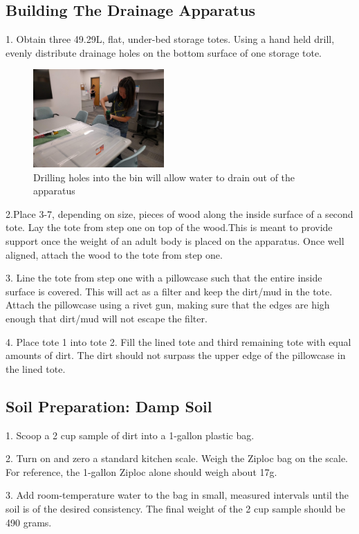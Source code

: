 \subsection{Building The Drainage Apparatus}

1. Obtain three 49.29L, flat, under-bed storage totes. Using a hand held drill, evenly distribute drainage holes on the bottom surface of one storage tote.

\begin{figure}[!htp]
\centering
\includegraphics[width=5cm]{Cast_Drill}
\caption{Drilling holes into the bin will allow water to drain out of the apparatus}
\label{Image 1}
\end{figure}

2.Place 3-7, depending on size, pieces of wood along the inside surface of a second tote. Lay the tote from step one on top of the wood.This is meant to provide support once the weight of an adult body is placed on the apparatus. Once well aligned, attach the wood to the tote from step one. 

3. Line the tote from step one with a pillowcase such that the entire inside surface is covered. This will act as a filter and keep the dirt/mud in the tote. Attach the pillowcase using a rivet gun, making sure that the edges are high enough that dirt/mud will not escape the filter. 

4. Place tote 1 into tote 2. Fill the lined tote and third remaining tote with equal amounts of dirt. The dirt should not surpass the upper edge of the pillowcase in the lined tote.

\subsection{Soil Preparation: Damp Soil} 

1. Scoop a 2 cup sample of dirt into a 1-gallon plastic bag. 

2. Turn on and zero a standard kitchen scale. Weigh the Ziploc bag on the scale. For reference, the 1-gallon Ziploc alone should weigh about 17g.

3. Add room-temperature water to the bag in small, measured intervals until the soil is of the desired consistency. The final weight of the 2 cup sample should be 490 grams. 

